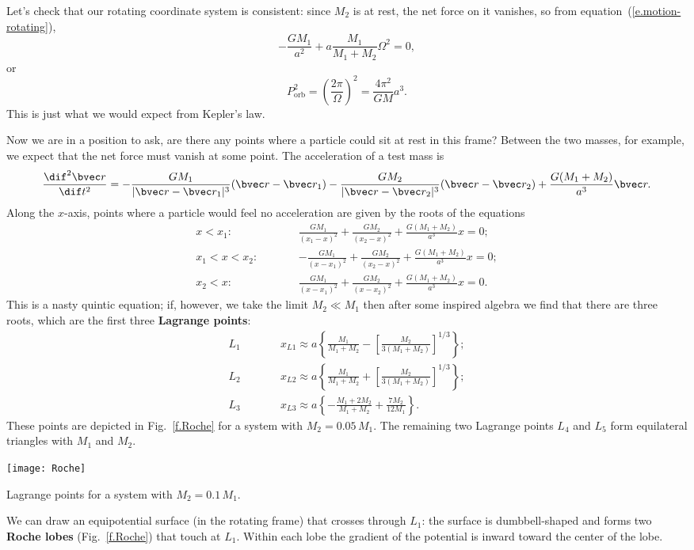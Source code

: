 Let's check that our rotating coordinate system is consistent: since $M_{2}$ is at rest, the net force on it vanishes, so from equation~(\ref{e.motion-rotating}),
\[ -\frac{GM_{1}}{a^{2}} + a\frac{M_{1}}{M_{1}+M_{2}}\Omega^{2} = 0, \]
or
\[ P_{\mathrm{orb}}^{2} = \left(\frac{2\pi}{\Omega}\right)^{2} = \frac{4\pi^{2}}{GM}a^{3}. \]
This is just what we would expect from Kepler's law.

Now we are in a position to ask, are there any points where a particle could sit at rest in this frame?
Between the two masses, for example, we expect that the net force must vanish at some point. The acceleration of a test mass is 
\begin{equation}\label{e.test-mass-acceleration-x}
\DDtt{\rv} = -\frac{GM_{1}}{|\rv-\rv_{1}|^{3}}(\rv-\rv_{1}) - \frac{GM_{2}}{|\rv-\rv_{2}|^{3}}(\rv-\rv_{2}) + \frac{G(M_{1}+M_{2})}{a^{3}} \rv.
\end{equation}
Along the $x$-axis, points where a particle would feel no acceleration are given by the roots of the equations
\begin{eqnarray*}
	x < x_{1}:&\qquad& \frac{GM_{1}}{(x_{1}-x)^{2}} + \frac{GM_{2}}{(x_{2}-x)^{2}} + \frac{G(M_{1}+M_{2})}{a^{3}} x = 0;\\
	x_{1} < x < x_{2}:&\qquad& -\frac{GM_{1}}{(x-x_{1})^{2}} + \frac{GM_{2}}{(x_{2}-x)^{2}} + \frac{G(M_{1}+M_{2})}{a^{3}} x = 0;\\
	x_{2} < x:&\qquad& \frac{GM_{1}}{(x-x_{1})^{2}} + \frac{GM_{2}}{(x-x_{2})^{2}} + \frac{G(M_{1}+M_{2})}{a^{3}} x = 0.
\end{eqnarray*}
This is a nasty quintic equation; if, however, we take the limit $M_{2}\ll M_{1}$ then after some inspired algebra we find that there are three roots, which are the first three \textbf{Lagrange points}:
\begin{eqnarray*}
L_{1} &\qquad& x_{L1} \approx a\left\{\frac{M_{1}}{M_{1}+M_{2}} - \left[\frac{M_{2}}{3(M_{1}+M_{2})}\right]^{1/3}\right\};\\
L_{2} &\qquad& x_{L2} \approx a\left\{\frac{M_{1}}{M_{1}+M_{2}} + \left[\frac{M_{2}}{3(M_{1}+M_{2})}\right]^{1/3}\right\};\\
L_{3} &\qquad& x_{L3} \approx a\left\{-\frac{M_{1}+2M_{2}}{M_{1}+M_{2}} + \frac{7M_{2}}{12M_{1}}\right\}.
\end{eqnarray*}
These points are depicted in Fig.~\ref{f.Roche} for a system with $M_{2} = 0.05\,M_{1}$.
The remaining two Lagrange points $L_{4}$ and $L_{5}$ form equilateral triangles with $M_{1}$ and $M_{2}$.
\begin{marginfigure}[-8\baselineskip]
\texttt{[image: Roche]}
\caption{Lagrange points for a system with $M_{2} = 0.1\,M_{1}$.
\label{f.Roche}}
\end{marginfigure}
We can draw an equipotential surface (in the rotating frame) that crosses through $L_{1}$: the surface is dumbbell-shaped and forms two \textbf{Roche lobes} (Fig.~\ref{f.Roche}) that touch at $L_{1}$.  Within each lobe the gradient of the potential is inward toward the center of the lobe.

